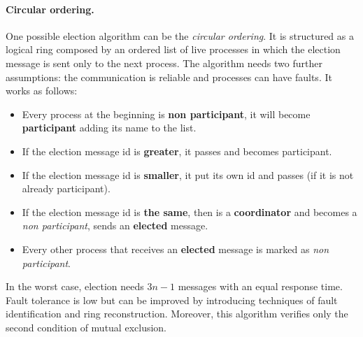 \paragraph*{Circular ordering.} One possible election algorithm can be the \textit{circular ordering}. It is structured as a logical ring composed by an ordered list of live processes in which the election message is sent only to the next process. The algorithm needs two further assumptions: the communication is reliable and processes can have faults. It works as follows:
\begin{itemize}
	\item Every process at the beginning is \textbf{non participant}, it will become \textbf{participant} adding its name to the list.
	\item If the election message id is \textbf{greater}, it passes and becomes participant.
	\item If the election message id is \textbf{smaller}, it put its own id and passes (if it is not already participant).
	\item If the election message id is \textbf{the same}, then is a \textbf{coordinator} and becomes a \textit{non participant}, sends an \textbf{elected} message.
	\item Every other process that receives an \textbf{elected} message is marked as \textit{non participant}.
\end{itemize}
In the worst case, election needs $3n - 1$ messages with an equal response
time.\\
Fault tolerance is low but can be improved by introducing techniques of fault
identification and ring reconstruction. Moreover, this algorithm verifies only the second condition of mutual exclusion.

